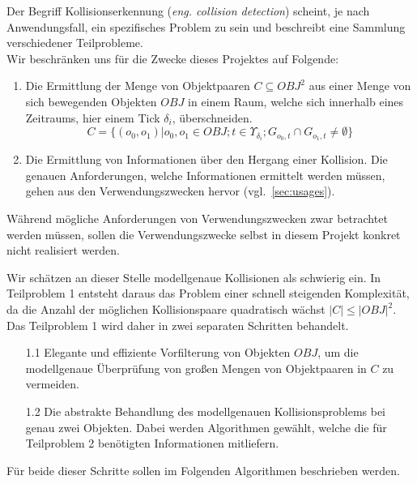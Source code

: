 \label{ref:problem_def}
Der Begriff Kollisionserkennung (\textit{eng. collision detection}) scheint, je nach Anwendungsfall, ein spezifisches Problem zu sein und beschreibt eine Sammlung verschiedener Teilprobleme.\\
Wir beschränken uns für die Zwecke dieses Projektes auf Folgende:
\begin{enumerate}
\item Die Ermittlung der Menge von Objektpaaren $C \subseteq OBJ^2$ aus einer Menge von sich bewegenden Objekten $OBJ$ in einem Raum, welche sich innerhalb eines Zeitraums, hier einem Tick $\delta_i$, überschneiden.
$$C = \{(o_0, o_1) | o_0, o_1 \in OBJ; t\in \Upsilon_{\delta_i}; G_{o_0, t} \cap G_{o_1, t} \neq \emptyset\}$$
\item Die Ermittlung von Informationen über den Hergang einer Kollision.
Die genauen Anforderungen, welche Informationen ermittelt werden müssen, gehen aus den Verwendungszwecken hervor (vgl.~\ref{sec:usages}). 
\end{enumerate}

Während mögliche Anforderungen von Verwendungszwecken zwar betrachtet werden müssen, sollen die Verwendungszwecke selbst in diesem Projekt konkret nicht realisiert werden.

Wir schätzen an dieser Stelle modellgenaue Kollisionen als schwierig ein. In Teilproblem 1 entsteht daraus das Problem einer schnell steigenden Komplexität, da die Anzahl der möglichen Kollisionspaare quadratisch wächst $|C|\leq |OBJ|^2$.\\
Das Teilproblem 1 wird daher in zwei separaten Schritten behandelt.
\begin{itemize}
\item[1.1] Elegante und effiziente Vorfilterung von Objekten $OBJ$, um die modellgenaue Überprüfung von großen Mengen von Objektpaaren in $C$ zu vermeiden.
\item[1.2] Die abstrakte Behandlung des modellgenauen Kollisionsproblems bei genau zwei Objekten. Dabei werden Algorithmen gewählt, welche die für Teilproblem 2 benötigten Informationen mitliefern.
\end{itemize}

Für beide dieser Schritte sollen im Folgenden Algorithmen beschrieben werden.\\
\\
